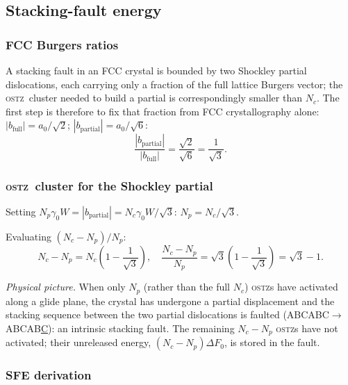 \documentclass[5p,sort&compress]{elsarticle}
\newcommand{\OSTZ}{\textsc{ostz}}
\newcommand{\dF}{\Delta F_0}
\newcommand{\gz}{\gamma_0}
\begin{document}
\subsection{Stacking-fault energy}
\label{sec:SFE}

\subsubsection{FCC Burgers ratios}

A stacking fault in an FCC crystal is bounded by two Shockley
partial dislocations, each carrying only a fraction of the full
lattice Burgers vector; the \OSTZ\ cluster needed to build a partial
is correspondingly smaller than $N_c$. The first step is therefore
to fix that fraction from FCC crystallography alone:
$|b_\text{full}|=a_0/\sqrt2$; $|b_\text{partial}|=a_0/\sqrt6$:
\begin{equation}
  \frac{|b_\text{partial}|}{|b_\text{full}|}
  =\frac{\sqrt2}{\sqrt6}=\frac{1}{\sqrt3}.
  \label{eq:bratio}
\end{equation}

\subsubsection{\OSTZ\ cluster for the Shockley partial}

Setting $N_p\gz W=|b_\text{partial}|=N_c\gz W/\sqrt3$:
$N_p=N_c/\sqrt3$.

Evaluating $(N_c-N_p)/N_p$:
\[
  N_c-N_p=N_c\!\left(1-\frac{1}{\sqrt3}\right),\quad
  \frac{N_c-N_p}{N_p}=\sqrt3\!\left(1-\frac{1}{\sqrt3}\right)=\sqrt3-1.
\]

\textit{Physical picture.} When only $N_p$ (rather than the full
$N_c$) \OSTZ s have activated along a glide plane, the crystal has
undergone a partial displacement and the stacking sequence between
the two partial dislocations is faulted
(ABCABC$\to$ABCAB\underline{C}): an intrinsic stacking fault. The
remaining $N_c-N_p$ \OSTZ s have not activated; their unreleased
energy, $(N_c-N_p)\dF$, is stored in the fault.

\subsubsection{SFE derivation}
\end{document}
